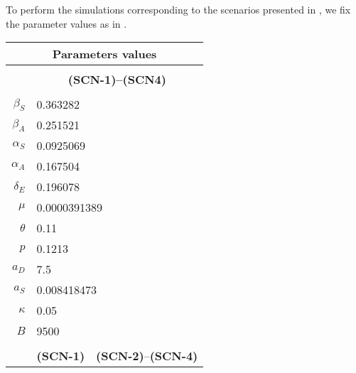 To perform the simulations corresponding to the scenarios presented in
, we fix the parameter values as in
.
%
\begin{table*}[tbh]
    \begin{center}
        \begin{tabular}{rc@{}c}
            \toprule
            \multicolumn{3}{c}{\textbf{Parameters values}}
            \\
            \midrule
            \\
            & \multicolumn{2}{c}{\textbf{(SCN-1)--(SCN4)}}
            \\
            \cmidrule{2-3}
            \\
            $\beta_S$
            & \multicolumn{2}{l}{\num{0.363282}}
            \\
            $\beta_A$
            & \multicolumn{2}{l}{\num{0.251521}}
            \\
            $\alpha_{S}$
            & \multicolumn{2}{l}{\num{0.0925069}}
            \\
            $\alpha_{A}$
            & \multicolumn{2}{l}{\num{0.167504}}
            \\
            $\delta_{E}$
            & \multicolumn{2}{l}{\num{0.196078}}
            \\
            $\mu$
            &\multicolumn{2}{l}{\num{0.0000391389}}
            \\
            $\theta$
            & \multicolumn{2}{l}{\num{0.11}}
            \\
            $p$
            & \multicolumn{2}{l}{\num{0.1213}}
            \\
            $a_D$
            & \multicolumn{2}{l}{\num{7.5}}
            \\
            $a_S$
            & \multicolumn{2}{l}{\num{0.008418473}}
            \\
            $\kappa$
            & \multicolumn{2}{l}{\num{0.05}}
            \\
            $B$
            & \multicolumn{2}{l}{\num{9500}}
            \\
            \\
            & \textbf{(SCN-1)}
            & \textbf{(SCN-2)}--\textbf{(SCN-4)}
            \\
            \cmidrule{2-3}

\end{tabular}
\end{center}
\end{table*}
